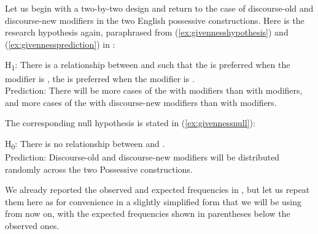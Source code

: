 Let us begin with a two\hyp{}by\hyp{}two design  and return to the case of discourse\hyp{}old and discourse\hyp{}new modifiers in the two English possessive  constructions. Here is the research hypothesis again, paraphrased from (\ref{ex:givennesshypothesis}) and (\ref{ex:givennessprediction}) in :

\begin{exe}
\ex H\textsubscript{1}: There is a relationship between  and  such that the  is preferred when the modifier is , the   is preferred when the modifier is .\\
Prediction: There will be more cases of the  with  modifiers than with  modifiers, and more cases of the  with discourse\hyp{}new modifiers than with \linebreak modifiers.
\label{ex:givennessalternative}
\end{exe}

The corresponding null hypothesis  is stated in  (\ref{ex:givennessnull}):

\begin{exe}
\ex H\textsubscript{0}: There is no relationship between  and .\smallskip\\
Prediction: Discourse\hyp{}old and discourse\hyp{}new modifiers will be distributed  randomly  across the two Possessive  constructions.
\label{ex:givennessnull}
\end{exe}

We already reported the observed and expected  frequencies in , but let us repeat them here as  for convenience in a slightly simplified form that we will be using from now on, with the expected frequencies shown in parentheses below the observed ones.

